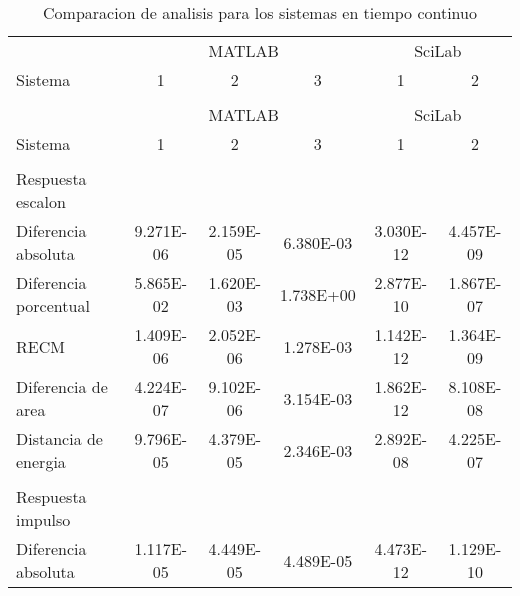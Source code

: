         {\setlength\LTleft{0pt}
        \setlength\LTright{0pt}
        \scriptsize
        \centering
        \renewcommand{\arraystretch}{0.87}
        \begin{longtable}{l @{\extracolsep{\fill}} ccccc}
            \caption[Comparacion de analisis - tiempo continuo]{Comparacion de analisis para los sistemas en tiempo continuo}
            \label{tab:AnalisisStepC} \\
            \toprule
                    & \multicolumn{3}{c}{MATLAB} & \multicolumn{2}{c}{SciLab}\\ \cmidrule{2-4}\cmidrule{5-6}
            Sistema &    1    &    2    &    3   &     1       &       2     \\ \cmidrule{2-2}\cmidrule{3-3}\cmidrule{4-4}\cmidrule{5-5}\cmidrule{6-6}
            & & & & & \\
            \endfirsthead
            \toprule
                    & \multicolumn{3}{c}{MATLAB} & \multicolumn{2}{c}{SciLab}\\ \cmidrule{2-4}\cmidrule{5-6}
            Sistema &    1    &    2    &    3   &     1       &       2     \\ \cmidrule{2-2}\cmidrule{3-3}\cmidrule{4-4}\cmidrule{5-5}\cmidrule{6-6}
            & & & & & \\
            \endhead
            \bottomrule
            \endfoot
            Respuesta escalon      &  &  &  &  & \\ \cmidrule{1-1}
            Diferencia absoluta    & \num{9.271E-06} & \num{2.159E-05} & \num{6.380E-03} & \num{3.030E-12} & \num{4.457E-09}  \\
            Diferencia porcentual  & \num{5.865E-02} & \num{1.620E-03} & \num{1.738E+00} & \num{2.877E-10} & \num{1.867E-07}  \\
            RECM                   & \num{1.409E-06} & \num{2.052E-06} & \num{1.278E-03} & \num{1.142E-12} & \num{1.364E-09}  \\
            Diferencia de area     & \num{4.224E-07} & \num{9.102E-06} & \num{3.154E-03} & \num{1.862E-12} & \num{8.108E-08}  \\
            Distancia de energia   & \num{9.796E-05} & \num{4.379E-05} & \num{2.346E-03} & \num{2.892E-08} & \num{4.225E-07}  \\
            & & & & & \\
            Respuesta impulso      &  &  &  &  & \\ \cmidrule{1-1}
            Diferencia absoluta    & \num{1.117E-05} & \num{4.449E-05} & \num{4.489E-05} & \num{4.473E-12} & \num{1.129E-10}  \\

\end{longtable}}
